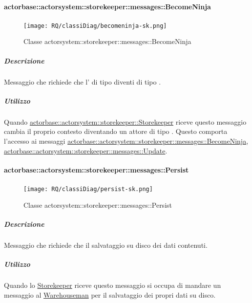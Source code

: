 \documentclass{scalatekids-article}
\begin{document}
\paragraph{actorbase::actorsystem::storekeeper::messages::BecomeNinja}
\label{sec:actorbase::actorsystem::storekeeper::messages::BecomeNinja}

\begin{figure}[H]
  \begin{center}
    \texttt{[image: RQ/classiDiag/becomeninja-sk.png]}
    \caption{Classe actorsystem::storekeeper::messages::BecomeNinja}
  \end{center}
\end{figure}

\subparagraph{Descrizione}
Messaggio che richiede che l' di tipo  diventi di tipo
.

\subparagraph{Utilizzo}
Quando \hyperref[sec:actorbase::actorsystem::storekeeper::Storekeeper]{actorbase::actorsystem::storekeeper::Storekeeper}
riceve questo messaggio cambia il proprio contesto diventando un attore di tipo . Questo comporta l'accesso ai messaggi
\hyperref[sec:actorbase::actorsystem::storekeeper::messages::BecomeNinja]{actorbase::\allowbreak{}actorsystem::\allowbreak{}storekeeper::\allowbreak{}messages::\allowbreak{}BecomeNinja},
\hyperref[sec:actorbase::actorsystem::storekeeper::messages::Update]{actorbase::\allowbreak{}actorsystem::\allowbreak{}storekeeper::\allowbreak{}messages::\allowbreak{}Update}.

\paragraph{actorbase::actorsystem::storekeeper::messages::Persist}
\label{sec:actorbase::actorsystem::storekeeper::messages::Persist}

\begin{figure}[H]
  \begin{center}
    \texttt{[image: RQ/classiDiag/persist-sk.png]}
    \caption{Classe actorsystem::storekeeper::messages::Persist}
  \end{center}
\end{figure}

\subparagraph{Descrizione}
Messaggio che richiede che il salvataggio su disco dei dati contenuti.

\subparagraph{Utilizzo}
Quando lo \hyperref[sec:actorbase::actorsystem::storekeeper::Storekeeper]{Storekeeper}
riceve questo messaggio si occupa di mandare un messaggio al \hyperref[sec:actorbase::actorsystem::warehouseman::Warehouseman]{Warehouseman}
per il salvataggio dei propri dati su disco.
\end{document}
